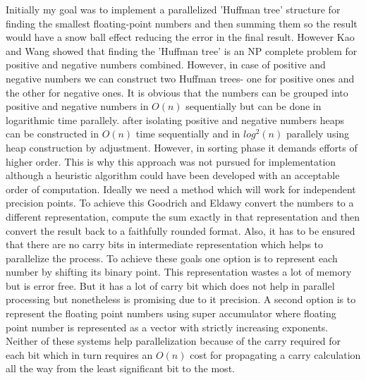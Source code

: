 \documentclass[11pt]{article}       %
\begin{document}
Initially my goal was to implement a parallelized 'Huffman tree' structure for finding the smallest floating-point numbers and then summing them so the result would have a snow ball effect reducing the error in the final result. However Kao and Wang \cite{LTALCNS} showed that finding the 'Huffman tree' is an NP complete problem for positive and negative numbers combined. However, in case of positive and negative numbers we can construct two Huffman trees- one for positive ones and the other for negative ones. It is obvious that the numbers can be grouped into positive and negative numbers in $O(n)$ sequentially but can be done in logarithmic time parallely. after isolating positive and negative numbers heaps can be constructed in $O(n)$ time sequentially and in $log^2(n)$ parallely using heap construction by adjustment. However, in sorting phase it demands efforts of higher order. This is why this approach was not pursued for implementation although a heuristic algorithm could have been developed with an acceptable order of computation.
Ideally we need a method which will work for independent precision points. To achieve this Goodrich and Eldawy \cite{PASFPN} convert the numbers to a different representation, compute the sum exactly in that representation and then convert the result back to a faithfully rounded format. Also, it has to be ensured that there are no carry bits in intermediate representation which helps to parallelize the process. To achieve these goals one option is to represent each number by shifting its binary point. This representation wastes a lot of memory but is error free. But it has a lot of carry bit which does not help in parallel processing but nonetheless is promising due to it precision. A second option is to represent the floating point numbers using super accumulator where floating point number is represented as a vector with strictly increasing exponents. Neither of these systems help parallelization because of the carry required for each bit which in turn requires an $O(n)$ cost for propagating a carry calculation all the way from the least significant bit to the most.
\end{document}
